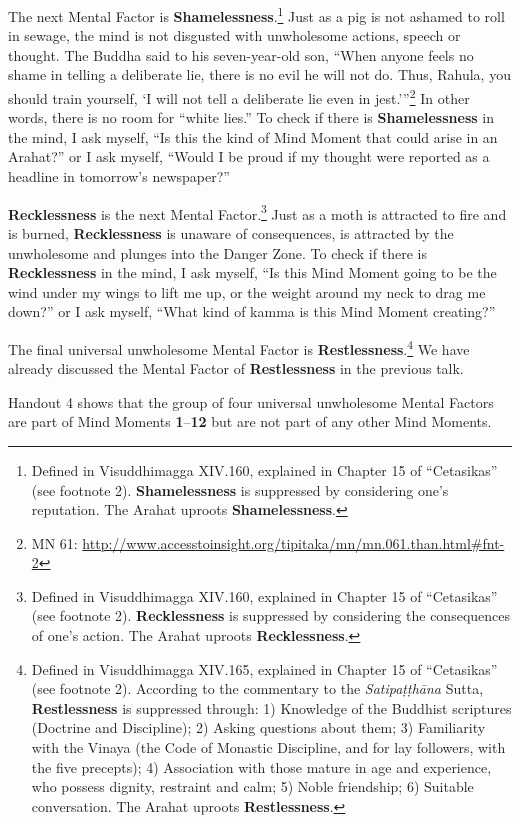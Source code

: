 The next Mental Factor is \textbf{Shamelessness}.\footnote{Defined in Visuddhimagga XIV.160, explained in Chapter 15 of “Cetasikas” (see footnote 2). \textbf{Shamelessness} is suppressed by considering one’s reputation. The Arahat uproots \textbf{Shamelessness}.} Just as a pig is not ashamed to roll in sewage, the mind is not disgusted with unwholesome actions, speech or thought. The Buddha said to his seven-year-old son, “When anyone feels no shame in telling a deliberate lie, there is no evil he will not do. Thus, Rahula, you should train yourself, `I will not tell a deliberate lie even in jest.’”\footnote{MN 61: \url{http://www.accesstoinsight.org/tipitaka/mn/mn.061.than.html\#fnt-2}} In other words, there is no room for “white lies.” To check if there is \textbf{Shamelessness} in the mind, I ask myself, “Is this the kind of Mind Moment that could arise in an Arahat?” or I ask myself, “Would I be proud if my thought were reported as a headline in tomorrow’s newspaper?”

\textbf{Recklessness} is the next Mental Factor.\footnote{Defined in Visuddhimagga XIV.160, explained in Chapter 15 of “Cetasikas” (see footnote 2). \textbf{Recklessness} is suppressed by considering the consequences of one’s action. The Arahat uproots \textbf{Recklessness}.} Just as a moth is attracted to fire and is burned, \textbf{Recklessness} is unaware of consequences, is attracted by the unwholesome and plunges into the Danger Zone. To check if there is \textbf{Recklessness} in the mind, I ask myself, “Is this Mind Moment going to be the wind under my wings to lift me up, or the weight around my neck to drag me down?” or I ask myself, “What kind of kamma is this Mind Moment creating?”

The final universal unwholesome Mental Factor is \textbf{Restlessness}.\footnote{Defined in Visuddhimagga XIV.165, explained in Chapter 15 of “Cetasikas” (see footnote 2). According to the commentary to the \textit{Satipaṭṭhāna} Sutta, \textbf{Restlessness} is suppressed through: 1) Knowledge of the Buddhist scriptures (Doctrine and Discipline); 2) Asking questions about them; 3) Familiarity with the Vinaya (the Code of Monastic Discipline, and for lay followers, with the five precepts); 4) Association with those mature in age and experience, who possess dignity, restraint and calm; 5) Noble friendship; 6) Suitable conversation. The Arahat uproots \textbf{Restlessness}.} We have already discussed the Mental Factor of \textbf{Restlessness} in the previous talk.

Handout 4 shows that the group of four universal unwholesome Mental Factors are part of Mind Moments \textbf{1}--\textbf{12} but are not part of any other Mind Moments.

